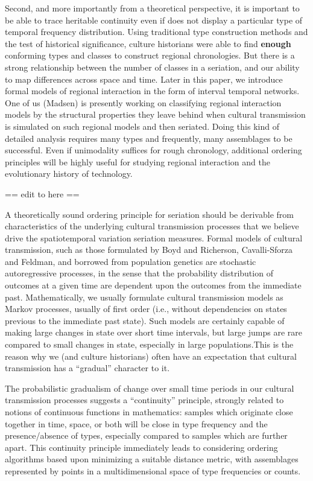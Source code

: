\documentclass[graybox,natbib]{svmult}
\begin{document}
Second, and more importantly from a theoretical perspective, it is
important to be able to trace heritable continuity even if does not
display a particular type of temporal frequency distribution. Using
traditional type construction methods and the test of historical
significance, culture historians were able to find \textbf{enough}
conforming types and classes to construct regional chronologies. But
there is a strong relationship between the number of classes in a
seriation, and our ability to map differences across space and time.
Later in this paper, we introduce formal models of regional interaction
in the form of interval temporal networks. One of us (Madsen) is
presently working on classifying regional interaction models by the
structural properties they leave behind when cultural transmission is
simulated on such regional models and then seriated. Doing this kind of
detailed analysis requires many types and frequently, many assemblages
to be successful. Even if unimodality suffices for rough chronology,
additional ordering principles will be highly useful for studying
regional interaction and the evolutionary history of technology.

== edit to here ==

A theoretically sound ordering principle for seriation should be
derivable from characteristics of the underlying cultural transmission
processes that we believe drive the spatiotemporal variation seriation
measures. Formal models of cultural transmission, such as those
formulated by Boyd and Richerson, Cavalli-Sforza and Feldman, and
borrowed from population genetics
\citep{Boyd1985, Cavalli-Sforza1981, Neiman1995} are stochastic
autoregressive processes, in the sense that the probability distribution
of outcomes at a given time are dependent upon the outcomes from the
immediate past. Mathematically, we usually formulate cultural
transmission models as Markov processes, usually of first order (i.e.,
without dependencies on states previous to the immediate past state).
Such models are certainly capable of making large changes in state over
short time intervals, but large jumps are rare compared to small changes
in state, especially in large populations.This is the reason why we (and
culture historians) often have an expectation that cultural transmission
has a ``gradual'' character to it.

The probabilistic gradualism of change over small time periods in our
cultural transmission processes suggests a ``continuity'' principle,
strongly related to notions of continuous functions in mathematics:
samples which originate close together in time, space, or both will be
close in type frequency and the presence/absence of types, especially
compared to samples which are further apart. This continuity principle
immediately leads to considering ordering algorithms based upon
minimizing a suitable distance metric, with assemblages represented by
points in a multidimensional space of type frequencies or counts.
\end{document}
